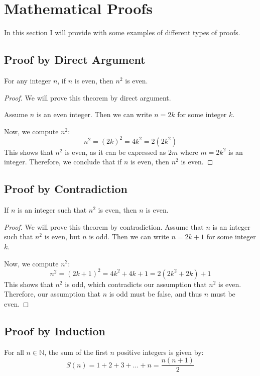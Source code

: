 \section{Mathematical Proofs}
In this section I will provide with some examples of different types of proofs.
\subsection{Proof by Direct Argument}

For any integer \( n \), if \( n \) is even, then \( n^2 \) is even.
\begin{proof}
	We will prove this theorem by direct argument.

	Assume \( n \) is an even integer. Then we can write \( n = 2k \) for some integer \( k \).

	Now, we compute \( n^2 \):
	\[
		n^2 = (2k)^2 = 4k^2 = 2(2k^2)
	\]
	This shows that \( n^2 \) is even, as it can be expressed as \( 2m \) where \( m = 2k^2 \) is an integer.
	Therefore, we conclude that if \( n \) is even, then \( n^2 \) is even.
\end{proof}
\subsection{Proof by Contradiction}

If \( n \) is an integer such that \( n^2 \) is even, then \( n \) is even.

\begin{proof}
	We will prove this theorem by contradiction. Assume that \( n \) is an integer such that \( n^2 \) is even, but \( n \) is odd. Then we can write \( n = 2k + 1 \) for some integer \( k \).

	Now, we compute \( n^2 \):
	\[
		n^2 = (2k + 1)^2 = 4k^2 + 4k + 1 = 2(2k^2 + 2k) + 1
	\]
	This shows that \( n^2 \) is odd, which contradicts our assumption that \( n^2 \) is even. Therefore, our assumption that \( n \) is odd must be false, and thus \( n \) must be even.
\end{proof}
\subsection{Proof by Induction}

For all \( n \in \mathbb{N} \), the sum of the first \( n \) positive integers is given by:
\[
	S(n) = 1 + 2 + 3 + \ldots + n = \frac{n(n+1)}{2}
\]

